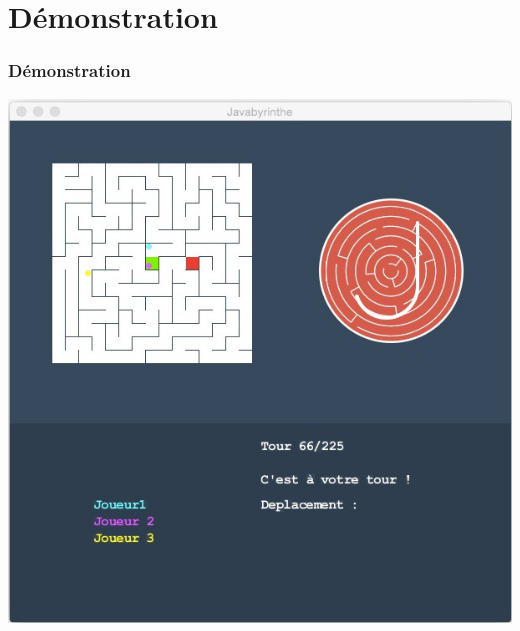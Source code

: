 \section{Démonstration}

  \begin{frame}
    \frametitle{Démonstration}
    \begin{center}
      \includegraphics[scale=0.47]{image/partieJavabyrinthe.jpg}
    \end{center}

  \end{frame}
